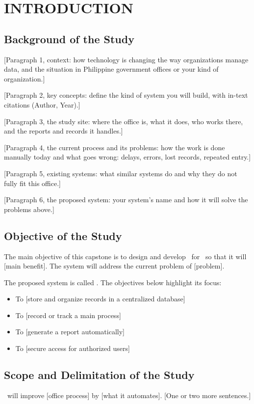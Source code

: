 \chapter{INTRODUCTION}

\section{Background of the Study}
[Paragraph 1, context: how technology is changing the way organizations manage data, and the situation in Philippine government offices or your kind of organization.]

[Paragraph 2, key concepts: define the kind of system you will build, with in-text citations (Author, Year).]

[Paragraph 3, the study site: where the office is, what it does, who works there, and the reports and records it handles.]

[Paragraph 4, the current process and its problems: how the work is done manually today and what goes wrong: delays, errors, lost records, repeated entry.]

[Paragraph 5, existing systems: what similar systems do and why they do not fully fit this office.]

[Paragraph 6, the proposed system: your system's name and how it will solve the problems above.]

\section{Objective of the Study}
The main objective of this capstone is to design and develop \SystemName\ for \OfficeName\ so that it will [main benefit]. The system will address the current problem of [problem].

The proposed system is called \SystemName. The objectives below highlight its focus:

\begin{itemize}[leftmargin=0.75in,itemsep=0pt,topsep=3pt]
  \item To [store and organize records in a centralized database]
  \item To [record or track a main process]
  \item To [generate a report automatically]
  \item To [secure access for authorized users]
\end{itemize}

\section{Scope and Delimitation of the Study}
\SystemName\ will improve [office process] by [what it automates]. [One or two more sentences.]

